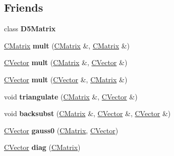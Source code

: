 \subsection*{Friends}
\begin{DoxyCompactItemize}
\item 
\mbox{\label{class_c_matrix_af67a0b018a3a881daae982607144823c}} 
class {\bfseries D5\+Matrix}
\item 
\mbox{\label{class_c_matrix_a7f18fdb0247e9d66a62d411289644618}} 
\hyperlink{class_c_matrix}{C\+Matrix} {\bfseries mult} (\hyperlink{class_c_matrix}{C\+Matrix} \&, \hyperlink{class_c_matrix}{C\+Matrix} \&)
\item 
\mbox{\label{class_c_matrix_ae3bcb59ce5bd16a62ea69b6f2ebf767c}} 
\hyperlink{class_c_vector}{C\+Vector} {\bfseries mult} (\hyperlink{class_c_matrix}{C\+Matrix} \&, \hyperlink{class_c_vector}{C\+Vector} \&)
\item 
\mbox{\label{class_c_matrix_a00c189e886ec7b81648e5a540607398e}} 
\hyperlink{class_c_vector}{C\+Vector} {\bfseries mult} (\hyperlink{class_c_vector}{C\+Vector} \&, \hyperlink{class_c_matrix}{C\+Matrix} \&)
\item 
\mbox{\label{class_c_matrix_a2393922b53bd51e5b132a144258aa11b}} 
void {\bfseries triangulate} (\hyperlink{class_c_matrix}{C\+Matrix} \&, \hyperlink{class_c_vector}{C\+Vector} \&)
\item 
\mbox{\label{class_c_matrix_a0d2a5909c5c6ac168de895354893f837}} 
void {\bfseries backsubst} (\hyperlink{class_c_matrix}{C\+Matrix} \&, \hyperlink{class_c_vector}{C\+Vector} \&, \hyperlink{class_c_vector}{C\+Vector} \&)
\item 
\mbox{\label{class_c_matrix_a2cc97e51f7920e9560f06dd6a32cfa49}} 
\hyperlink{class_c_vector}{C\+Vector} {\bfseries gauss0} (\hyperlink{class_c_matrix}{C\+Matrix}, \hyperlink{class_c_vector}{C\+Vector})
\item 
\mbox{\label{class_c_matrix_a58ff945ba1398b947f2b607444a1807d}} 
\hyperlink{class_c_vector}{C\+Vector} {\bfseries diag} (\hyperlink{class_c_matrix}{C\+Matrix})
\item 

\end{DoxyCompactItemize}
